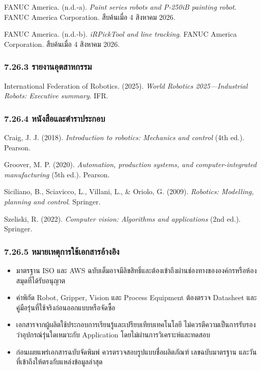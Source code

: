 FANUC America. (n.d.-a). \textit{Paint series robots and P-250iB painting robot}. FANUC America Corporation. สืบค้นเมื่อ 4 สิงหาคม 2026.

FANUC America. (n.d.-b). \textit{iRPickTool and line tracking}. FANUC America Corporation. สืบค้นเมื่อ 4 สิงหาคม 2026.

\subsubsection{7.26.3 รายงานอุตสาหกรรม}

International Federation of Robotics. (2025). \textit{World Robotics 2025—Industrial Robots: Executive summary}. IFR.

\subsubsection{7.26.4 หนังสือและตำราประกอบ}

Craig, J. J. (2018). \textit{Introduction to robotics: Mechanics and control} (4th ed.). Pearson.

Groover, M. P. (2020). \textit{Automation, production systems, and computer-integrated manufacturing} (5th ed.). Pearson.

Siciliano, B., Sciavicco, L., Villani, L., \& Oriolo, G. (2009). \textit{Robotics: Modelling, planning and control}. Springer.

Szeliski, R. (2022). \textit{Computer vision: Algorithms and applications} (2nd ed.). Springer.

\subsubsection{7.26.5 หมายเหตุการใช้เอกสารอ้างอิง}

\begin{itemize}
    \item มาตรฐาน ISO และ AWS ฉบับเต็มอาจมีลิขสิทธิ์และต้องเข้าถึงผ่านช่องทางขององค์กรหรือห้องสมุดที่ได้รับอนุญาต
    \item ค่าพิกัด Robot, Gripper, Vision และ Process Equipment ต้องตรวจ Datasheet และคู่มือรุ่นที่ใช้จริงก่อนออกแบบหรือจัดซื้อ
    \item เอกสารจากผู้ผลิตใช้ประกอบการเรียนรู้และเปรียบเทียบเทคโนโลยี ไม่ควรตีความเป็นการรับรองว่าอุปกรณ์รุ่นใดเหมาะกับ Application โดยไม่ผ่านการวิเคราะห์และทดสอบ
    \item ก่อนเผยแพร่เอกสารฉบับจัดพิมพ์ ควรตรวจสอบรูปแบบชื่อผลิตภัณฑ์ เลขฉบับมาตรฐาน และวันที่เข้าถึงให้ตรงกับแหล่งข้อมูลล่าสุด
\end{itemize}



